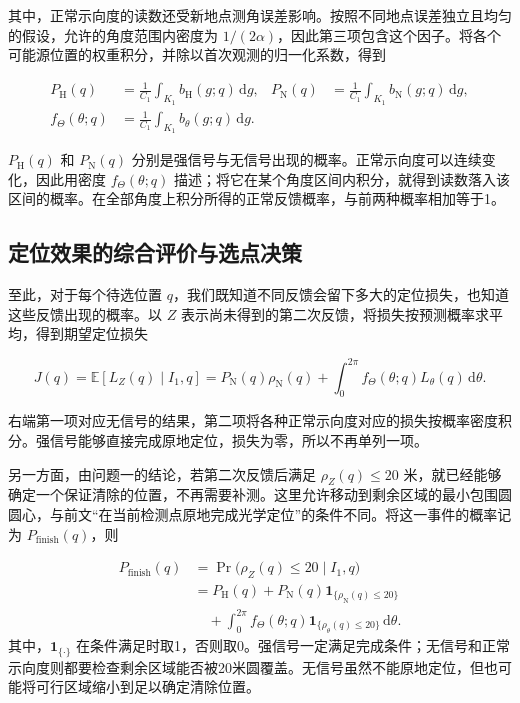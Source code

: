 其中，正常示向度的读数还受新地点测角误差影响。按照不同地点误差独立且均匀的假设，允许的角度范围内密度为 \(1/(2\alpha)\)，因此第三项包含这个因子。将各个可能源位置的权重积分，并除以首次观测的归一化系数，得到

\begin{equation}
\begin{aligned}
 P_{\mathrm H}(q)&=\frac{1}{C_1}\int_{K_1}b_{\mathrm H}(g;q)\,\mathrm dg,
 &P_{\mathrm N}(q)&=\frac{1}{C_1}\int_{K_1}b_{\mathrm N}(g;q)\,\mathrm dg,\\
 f_\Theta(\theta;q)&=\frac{1}{C_1}\int_{K_1}b_\theta(g;q)\,\mathrm dg.
\end{aligned}
\label{eq:q2-pair-prediction}
\end{equation}

\(P_{\mathrm H}(q)\) 和 \(P_{\mathrm N}(q)\) 分别是强信号与无信号出现的概率。正常示向度可以连续变化，因此用密度 \(f_\Theta(\theta;q)\) 描述；将它在某个角度区间内积分，就得到读数落入该区间的概率。在全部角度上积分所得的正常反馈概率，与前两种概率相加等于1。

\subsection{定位效果的综合评价与选点决策}

至此，对于每个待选位置 \(q\)，我们既知道不同反馈会留下多大的定位损失，也知道这些反馈出现的概率。以 \(Z\) 表示尚未得到的第二次反馈，将损失按预测概率求平均，得到期望定位损失

\begin{equation}
 J(q)=\mathbb E[L_Z(q)\mid I_1,q]
 =P_{\mathrm N}(q)\rho_{\mathrm N}(q)
 +\int_0^{2\pi}f_\Theta(\theta;q)L_\theta(q)\,\mathrm d\theta.
\label{eq:q2-pair-expected-objective}
\end{equation}

右端第一项对应无信号的结果，第二项将各种正常示向度对应的损失按概率密度积分。强信号能够直接完成原地定位，损失为零，所以不再单列一项。

另一方面，由问题一的结论，若第二次反馈后满足 \(\rho_Z(q)\le20\) 米，就已经能够确定一个保证清除的位置，不再需要补测。这里允许移动到剩余区域的最小包围圆圆心，与前文“在当前检测点原地完成光学定位”的条件不同。将这一事件的概率记为 \(P_{\mathrm{finish}}(q)\)，则

\begin{equation}
\begin{aligned}
 P_{\mathrm{finish}}(q)
 &=\Pr\bigl(\rho_Z(q)\le20\mid I_1,q\bigr)\\
 &=P_{\mathrm H}(q)+P_{\mathrm N}(q)\mathbf1_{\{\rho_{\mathrm N}(q)\le20\}}\\
 &\quad+\int_0^{2\pi}f_\Theta(\theta;q)\mathbf1_{\{\rho_\theta(q)\le20\}}\,\mathrm d\theta.
\end{aligned}
\label{eq:q2-completion-probability}
\end{equation}
其中，\(\mathbf1_{\{\cdot\}}\) 在条件满足时取1，否则取0。强信号一定满足完成条件；无信号和正常示向度则都要检查剩余区域能否被20米圆覆盖。无信号虽然不能原地定位，但也可能将可行区域缩小到足以确定清除位置。

